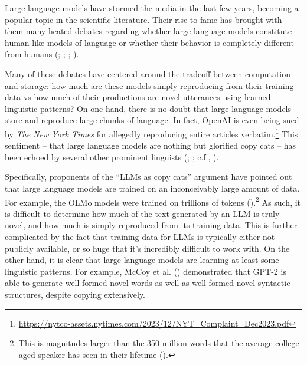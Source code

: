 \documentclass[
  12pt,
  letterpaper,
]{scrreprt}
\begin{document}
Large language models have stormed the media in the last few years,
becoming a popular topic in the scientific literature. Their rise to
fame has brought with them many heated debates regarding whether large
language models constitute human-like models of language or whether
their behavior is completely different from humans
(;
;
;
).

Many of these debates have centered around the tradeoff between
computation and storage: how much are these models simply reproducing
from their training data vs how much of their productions are novel
utterances using learned linguistic patterns? On one hand, there is no
doubt that large language models store and reproduce large chunks of
language. In fact, OpenAI is even being sued by \emph{The New York
Times} for allegedly reproducing entire articles verbatim.\footnote{\url{https://nytco-assets.nytimes.com/2023/12/NYT_Complaint_Dec2023.pdf}}
This sentiment -- that large language models are nothing but glorified
copy cats -- has been echoed by several other prominent linguists
(;
;
c.f., ).

Specifically, proponents of the ``LLMs as copy cats'' argument have
pointed out that large language models are trained on an inconceivably
large amount of data. For example, the OLMo models were trained on
trillions of tokens
().\footnote{This is magnitudes larger than the 350 million words
  that the average college-aged speaker has seen in their lifetime
  ().} As such, it is difficult to determine how much of the text
generated by an LLM is truly novel, and how much is simply reproduced
from its training data. This is further complicated by the fact that
training data for LLMs is typically either not publicly available, or so
huge that it's incredibly difficult to work with. On the other hand, it
is clear that large language models are learning at least some
linguistic patterns. For example, McCoy et al.
() demonstrated that GPT-2
is able to generate well-formed novel words as well as well-formed novel
syntactic structures, despite copying extensively.
\end{document}
